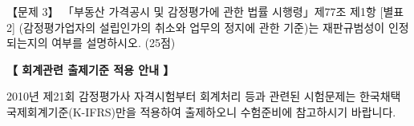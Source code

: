 \begin{longquestion}{【문제 3】}
「부동산 가격공시 및 감정평가에 관한 법률 시행령」제77조 제1항 [별표2] (감정평가업자의 설립인가의 취소와 업무의 정지에 관한 기준)는 재판규범성이 인정되는지의 여부를 설명하시오. (25점) \par
\medskip
\begin{framedtext}
\centering\textbf{【 회계관련 출제기준 적용 안내 】}\par
2010년 제21회 감정평가사 자격시험부터 회계처리 등과 관련된 시험문제는 한국채택국제회계기준(K-IFRS)만을 적용하여 출제하오니 수험준비에 참고하시기 바랍니다.
\end{framedtext}
\end{longquestion}
